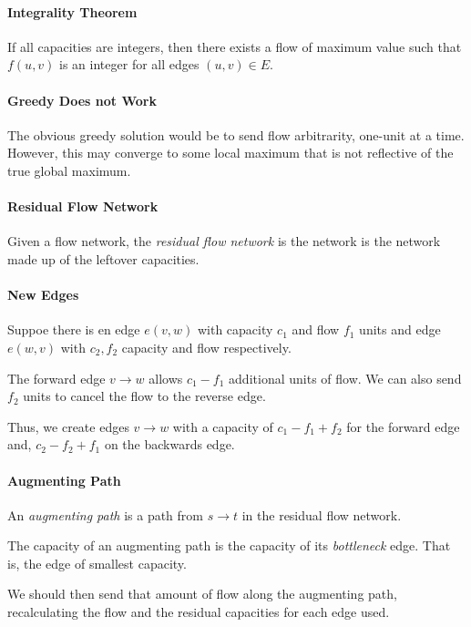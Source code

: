 \paragraph{Integrality Theorem}
If all capacities are integers, then there exists a flow of maximum value
such that \( f(u, v) \) is an integer for all
edges  \( \left( u, v \right) \in  E \).

\paragraph{Greedy Does not Work}
The obvious greedy solution would be to send flow arbitrarity,
one-unit at a time. However, this may converge to some local maximum
that is not reflective of the true global maximum.

\paragraph{Residual Flow Network}
Given a flow network, the \textit{residual flow network} is the network
is the network made up of the leftover capacities.

\paragraph{New Edges}
Suppoe there is en edge \( e(v, w) \) with capacity  \( c_1 \)
and flow  \( f_1 \) units and edge \( e(w, v) \)
with  \( c_2, f_2 \) capacity and flow respectively.

The forward edge \( v \to  w \) allows \( c_1 - f_1 \)
additional units of flow. We can also send \( f_2 \)
units to cancel the flow to the reverse edge.

Thus, we create edges \( v \to  w \) with a capacity of
\( c_1 - f_1 + f_2 \) for the forward edge and,
\( c_2 - f_2 + f_1 \) on the backwards edge.

\paragraph{Augmenting Path}
An \textit{augmenting path} is a path from \( s \to  t \) in the residual flow network.

The capacity of an augmenting path is the capacity of its \textit{bottleneck}
edge. That is, the edge of smallest capacity.

We should then send that amount of flow along the augmenting path, recalculating
the flow and the residual capacities for each edge used.

